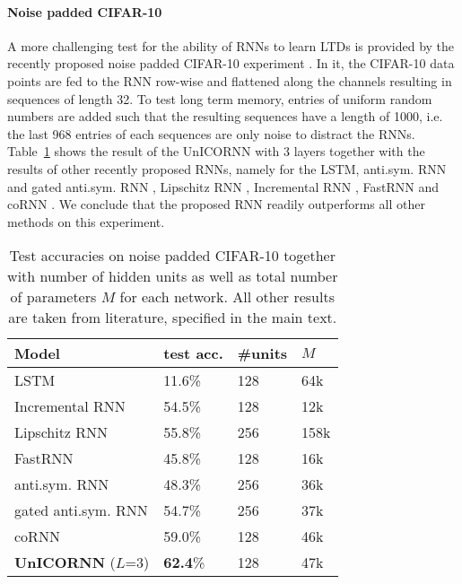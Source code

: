 \documentclass{article}
\newcommand{\Tref}[1]{Table~\ref{#1}}
\begin{document}
\paragraph{Noise padded CIFAR-10} 
A more challenging test for the ability of RNNs to learn LTDs is provided by the recently proposed noise padded CIFAR-10 experiment \citep{anti}. In it, the CIFAR-10 data points \citep{cifar} are fed to the RNN row-wise and flattened along the channels resulting in sequences of length 32. To test long term memory, entries of uniform random numbers are added such that the resulting sequences have a length of 1000, i.e. the last 968 entries of each sequences are only noise to distract the RNNs. \Tref{tab:cifar} shows the result of the UnICORNN with $3$ layers together with the results of other recently proposed RNNs, namely for the LSTM, anti.sym. RNN and gated anti.sym. RNN \citep{anti}, Lipschitz RNN \citep{lip_rnn}, Incremental RNN \citep{inc_rnn}, FastRNN \citep{fastrnn} and coRNN \cite{coRNN}. We conclude that the proposed RNN readily outperforms all other methods on this experiment.
\begin{table}[ht]
\caption{Test accuracies on noise padded CIFAR-10 together with number of hidden units as well as total number of parameters $M$ for each network. All other results are taken from literature, specified in the main text.}
\label{tab:cifar}
\vskip 0.15in
\begin{center}
\begin{small}
\begin{sc}
\begin{tabular}{llll}
\toprule
Model     & test acc. & \#units & $M$ \\
\midrule
LSTM & 11.6\% & 128 & 64k\\
Incremental RNN& 54.5\% & 128 & 12k\\
Lipschitz RNN & 55.8\%  & 256 & 158k\\
FastRNN & 45.8\% & 128 & 16k\\
anti.sym. RNN & 48.3\% & 256 & 36k\\
gated anti.sym. RNN & 54.7\% & 256 & 37k \\
coRNN & 59.0\% & 128 & 46k \\
\textbf{UnICORNN} ($L$=3) & \textbf{62.4}\% & 128 & 47k\\
\bottomrule
\end{tabular}
\end{sc}
\end{small}
\end{center}
\vskip -0.1in
\end{table}
\end{document}
